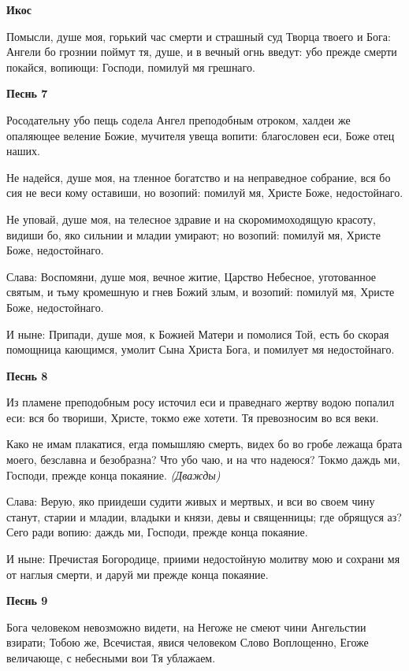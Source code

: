 \medskip
\bfseries Икос\normalfont{}


Помысли, душе моя, горький час смерти и страшный суд Творца твоего и Бога: Ангели бо грознии поймут тя, душе, и в вечный огнь введут: убо прежде смерти покайся, вопиющи: Господи, помилуй мя грешнаго.


\medskip
\bfseries Песнь 7\normalfont{}


Росодательну убо пещь содела Ангел преподобным отроком, халдеи же опаляющее веление Божие, мучителя увеща вопити: благословен еси, Боже отец наших.


Не надейся, душе моя, на тленное богатство и на неправедное собрание, вся бо сия не веси кому оставиши, но возопий: помилуй мя, Христе Боже, недостойнаго.


Не уповай, душе моя, на телесное здравие и на скоромимоходящую красоту, видиши бо, яко сильнии и младии умирают; но возопий: помилуй мя, Христе Боже, недостойнаго.


Слава: Воспомяни, душе моя, вечное житие, Царство Небесное, уготованное святым, и тьму кромешную и гнев Божий злым, и возопий: помилуй мя, Христе Боже, недостойнаго.


И ныне: Припади, душе моя, к Божией Матери и помолися Той, есть бо скорая помощница кающимся, умолит Сына Христа Бога, и помилует мя недостойнаго.


\medskip
\bfseries Песнь 8\normalfont{}


Из пламене преподобным росу источил еси и праведнаго жертву водою попалил еси: вся бо твориши, Христе, токмо еже хотети. Тя превозносим во вся веки.


Како не имам плакатися, егда помышляю смерть, видех бо во гробе лежаща брата моего, безславна и безобразна? Что убо чаю, и на что надеюся? Токмо даждь ми, Господи, прежде конца покаяние. \itshape (Дважды)\normalfont{}


Слава: Верую, яко приидеши судити живых и мертвых, и вси во своем чину станут, старии и младии, владыки и князи, девы и священницы; где обрящуся аз? Сего ради вопию: даждь ми, Господи, прежде конца покаяние.


И ныне: Пречистая Богородице, приими недостойную молитву мою и сохрани мя от наглыя смерти, и даруй ми прежде конца покаяние.


\medskip
\bfseries Песнь 9\normalfont{}


Бога человеком невозможно видети, на Негоже не смеют чини Ангельстии взирати; Тобою же, Всечистая, явися человеком Слово Воплощенно, Егоже величающе, с небесными вои Тя ублажаем.


